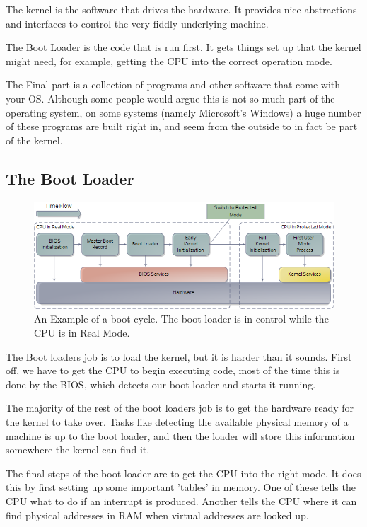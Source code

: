 \documentclass[a4paper]{report}
\begin{document}
The kernel is the software that drives the hardware. It provides nice abstractions and interfaces to control the very fiddly underlying machine.

The Boot Loader is the code that is run first. It gets things set up that the kernel might need, for example, getting the CPU into the correct operation mode.

The Final part is a collection of programs and other software that come with your OS. Although some people would argue this is not so much part of the operating system, on some systems (namely Microsoft's Windows) a huge number of these programs are built right in, and seem from the outside to in fact be part of the kernel.

\subsection*{The Boot Loader}

\begin{figure}[ht]
\centering
\includegraphics[width=500px]{images/bootProcess.png}
\caption{An Example of a boot cycle. The boot loader is in control while the CPU is in Real Mode.}
\label{fig:theloader}
\end{figure}

The Boot loaders job is to load the kernel, but it is harder than it sounds. First off, we have to get the CPU to begin executing code, most of the time this is done by the BIOS, which detects our boot loader and starts it running.

The majority of the rest of the boot loaders job is to get the hardware ready for the kernel to take over. Tasks like detecting the available physical memory of a machine is up to the boot loader, and then the loader will store this information somewhere the kernel can find it.

The final steps of the boot loader are to get the CPU into the right mode. It does this by first setting up some important 'tables' in memory. One of these tells the CPU what to do if an interrupt is produced. Another tells the CPU where it can find physical addresses in RAM when virtual addresses are looked up.
\end{document}
